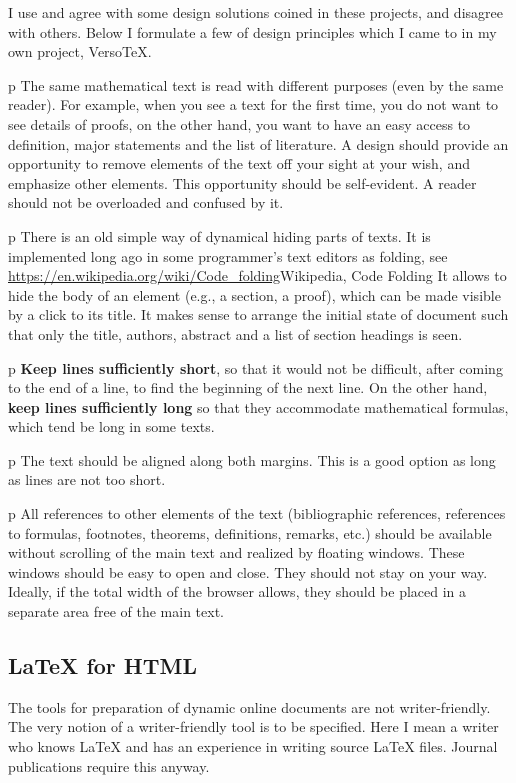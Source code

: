 \documentclass{article}
\begin{document}
I use and agree with some design solutions coined in these projects, and
disagree with others. Below I formulate a few of design principles 
which I came to in my own project, VersoTeX.

\<p The same mathematical text is read with different
purposes (even by the same reader). For example, when you see a text for 
the first time, you do not want to see details of proofs, on the other
hand, you want to have
an easy access to definition, major statements and the list of literature. 
A design
should provide an opportunity to remove elements of the text off your sight 
at your wish, and emphasize other elements. This opportunity should be
self-evident. A reader should not be overloaded and confused by it.

\<p There is an old simple way of dynamical hiding parts of
texts. It is implemented long ago in some programmer's text editors as
folding, see
\url{https://en.wikipedia.org/wiki/Code\_folding}{Wikipedia, Code Folding}  
It allows to hide the body of an element (e.g., a section, a proof), 
which can be made visible by a click to its title. It makes sense to
arrange the initial state of document such that only the title, authors,
abstract and a list of section headings is seen.

\<p\newline 
{\bf Keep lines sufficiently short\/}, so
that it would not be difficult, after coming to the end of a line, to find
the beginning of the next line. On the other hand,\newline
{\bf keep lines sufficiently long\/} so that they accommodate  
mathematical formulas, which tend be long in some texts. 

\<p The text should be aligned along both margins.
This is a good option as long as lines are not too short.

\<p All references to other elements of the
text (bibliographic references, references to formulas, footnotes, theorems,
definitions, remarks, etc.) should be available without scrolling of the main 
text and realized by floating windows. These windows should be easy to open
and close. They should not stay on your way. Ideally, if the total width of
the browser allows, they should be placed in a separate area free of the main
text.  

\subsection{LaTeX for HTML}\label{s4.3}
The tools for preparation of dynamic online documents are not
writer-friendly. The very notion of a writer-friendly tool is to be 
specified. Here I mean a writer who knows LaTeX and has an experience in
writing source LaTeX files. Journal publications require this anyway.
\end{document}
